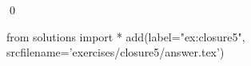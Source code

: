 
\begin{ex} 
  \label{ex:closure5}
  
  \qed
\end{ex} 
\begin{python0}
from solutions import *
add(label="ex:closure5",
    srcfilename='exercises/closure5/answer.tex') 
\end{python0}
